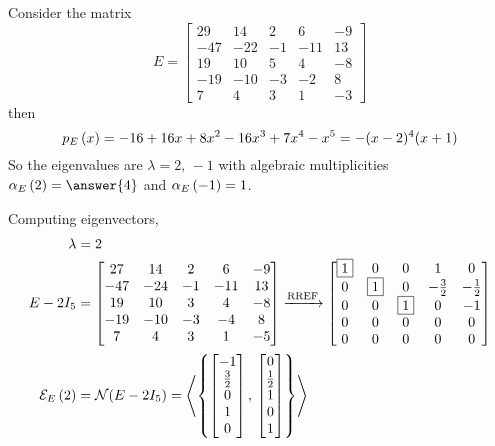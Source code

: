 \documentclass{ximera}
\begin{document}
\begin{example}
  
  Consider the matrix
  \[
    E=
    \begin{bmatrix}
      29 & 14 & 2 & 6 & -9\\
      -47 & -22 & -1 & -11 & 13\\
      19 & 10 & 5 & 4 & -8\\
      -19 & -10 & -3 & -2 & 8\\
      7 & 4 & 3 & 1 & -3
    \end{bmatrix}
  \]
  then
  \[
    p_{E}\left(x\right)=-16+16x+8x^2-16x^3+7x^4-x^5=-(x-2)^4(x+1)
  \]
  So the eigenvalues are $\lambda=2,\,-1$ with algebraic multiplicities $\algmult{E}{2}=\answer{4}$  and $\alpha_{E}\left(-1\right)=1$.
  
  Computing eigenvectors,
  \begin{align*}
    \lambda&=2\\
    E-2I_5&=
            \begin{bmatrix}
              27 & 14 & 2 & 6 & -9\\
              -47 & -24 & -1 & -11 & 13\\
              19 & 10 & 3 & 4 & -8\\
              -19 & -10 & -3 & -4 & 8\\
              7 & 4 & 3 & 1 & -5
            \end{bmatrix}
                              \rref
                              \begin{bmatrix}
                                \leading{1} & 0 & 0 & 1 & 0\\
                                0 & \leading{1} & 0 & -\frac{3}{2} & -\frac{1}{2}\\
                                0 & 0 & \leading{1} & 0 & -1\\
                                0 & 0 & 0 & 0 & 0\\
                                0 & 0 & 0 & 0 & 0
                              \end{bmatrix}\\
    \eigenspace{E}{2}&=\nsp{E-2I_5}
                       =\spn{\set{\colvector{-1\\\frac{3}{2}\\0\\1\\0},\,\colvector{0\\\frac{1}{2}\\1\\0\\1}}}

\end{align*}
\end{example}
\end{document}
